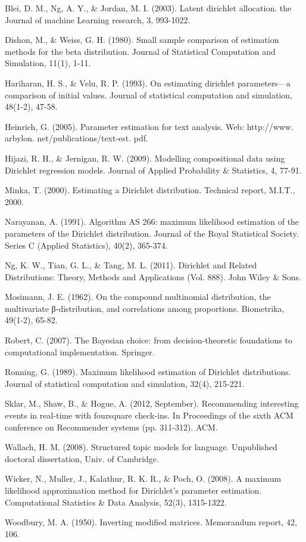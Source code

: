 \documentclass[twoside]{article}
\begin{document}
\begin{thebibliography}{20}

Blei, D. M., Ng, A. Y., \& Jordan, M. I. (2003). Latent dirichlet allocation. the Journal of machine Learning research, 3, 993-1022.

Dishon, M., \& Weiss, G. H. (1980). Small sample comparison of estimation methods for the beta distribution. Journal of Statistical Computation and Simulation, 11(1), 1-11.

Hariharan, H. S., \& Velu, R. P. (1993). On estimating dirichlet parameters—a comparison of initial values. Journal of statistical computation and simulation, 48(1-2), 47-58.

Heinrich, G. (2005). Parameter estimation for text analysis. Web: http://www. arbylon. net/publications/text-est. pdf.

Hijazi, R. H., \& Jernigan, R. W. (2009). Modelling compositional data using Dirichlet regression models. Journal of Applied Probability \& Statistics, 4, 77-91.

Minka, T. (2000). Estimating a Dirichlet distribution. Technical report, M.I.T., 2000.

Narayanan, A. (1991). Algorithm AS 266: maximum likelihood estimation of the parameters of the Dirichlet distribution. Journal of the Royal Statistical Society. Series C (Applied Statistics), 40(2), 365-374.

Ng, K. W., Tian, G. L., \& Tang, M. L. (2011). Dirichlet and Related Distributions: Theory, Methods and Applications (Vol. 888). John Wiley \& Sons.

Mosimann, J. E. (1962). On the compound multinomial distribution, the multivariate β-distribution, and correlations among proportions. Biometrika, 49(1-2), 65-82.

Robert, C. (2007). The Bayesian choice: from decision-theoretic foundations to computational implementation. Springer.

Ronning, G. (1989). Maximum likelihood estimation of Dirichlet distributions. Journal of statistical computation and simulation, 32(4), 215-221.

Sklar, M., Shaw, B., \& Hogue, A. (2012, September). Recommending interesting events in real-time with foursquare check-ins. In Proceedings of the sixth ACM conference on Recommender systems (pp. 311-312). ACM.

Wallach, H. M. (2008). Structured topic models for language. Unpublished doctoral dissertation, Univ. of Cambridge.

Wicker, N., Muller, J., Kalathur, R. K. R., \& Poch, O. (2008). A maximum likelihood approximation method for Dirichlet's parameter estimation. Computational Statistics \& Data Analysis, 52(3), 1315-1322.

Woodbury, M. A. (1950). Inverting modified matrices. Memorandum report, 42, 106.

\end{thebibliography}
\end{document}
